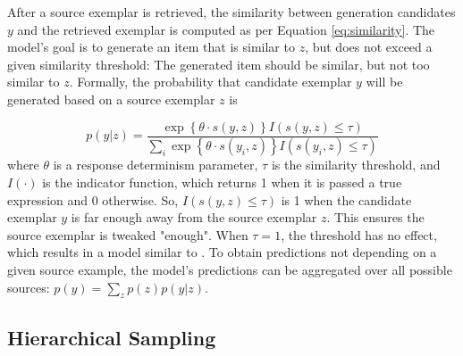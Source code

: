\documentclass[10pt,letterpaper]{article}
\begin{document}
After a source exemplar is retrieved, the similarity between generation candidates $y$ and the retrieved exemplar is computed as per Equation \ref{eq:similarity}. The model's goal is to generate an item that is similar to $z$, but does not exceed a given similarity threshold: The generated item should be similar, but not too similar to $z$. Formally, the probability that candidate exemplar $y$ will be generated based on a source exemplar $z$ is 

\begin{equation}
    p(y|z)  = \dfrac
    { \exp \left\{\theta \cdot s(y,z) \right\} I\left(s(y,z) \leq \tau\right) }
    {\sum_i{\exp \left\{ \theta \cdot s(y_i,z) \right\} I\left(s(y_i,z) \leq \tau\right)}} 
\end{equation}
% 
where $\theta$ is a response determinism parameter, $\tau$ is the similarity threshold, and $I(\cdot)$ is the indicator function, which returns 1 when it is passed a true expression and 0 otherwise. So, $I\left(s(y,z) \leq \tau\right)$ is 1 when the candidate exemplar $y$ is far enough away from the source exemplar $z$. This ensures the source exemplar is tweaked "enough". When $\tau=1$, the threshold has no effect, which results in a model similar to \citet{jern2013probabilistic}. To obtain predictions not depending on a given source example, the model's predictions can be aggregated over all possible sources: $p(y) = \sum_z{p(z)p(y|z)}$.

\subsection{Hierarchical Sampling}
\end{document}

